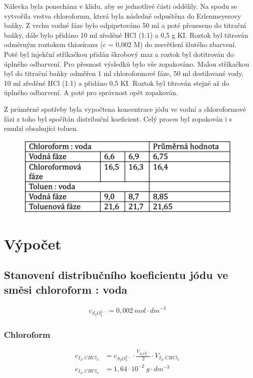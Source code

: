 \documentclass[13pt, a4paper, twoside]{article}
\begin{document}
Nálevka byla ponechána v klidu, aby se jednotlivé části oddělily. Na spodu se vytvořila vrstva chloroformu, která byla následně odpuštěna do Erlenmeyerovy baňky. Z vrchu vodné fáze bylo odpipetováno 50 ml a poté přeneseno do titrační baňky, dále bylo přidáno 10 ml zředěné HCl (1:1) a 0,5 g KI. Roztok byl titrován odměrným roztokem thiosíranu (c = 0,002 M) do zesvětlení žlutého zbarvení. Poté byl injekční stříkačkou přidán škrobový maz a roztok byl dotitrován do úplného odbarvení. Pro přesnost výsledků bylo vše zopakováno.
Malou stříkačkou byl do titrační baňky odměřen 1 ml chloroformové fáze, 50 ml destilované vody, 10 ml zředěné HCl (1:1) a přidáno 0,5 KI. Roztok byl titrován stejně až do úplného odbarvení. A poté pro správnost opět zopakován.

Z průměrné spotřeby byla vypočtena koncentrace jódu ve vodní a chloroformové fázi z toho byl spočítán distribuční koeficient.
Celý proces byl zopakován i s emulzí obsahující toluen.

\begin{figure}[H]
    \centering
    \includegraphics[width=13cm]{hh.png}
\end{figure}

\section*{Výpočet}
\subsection*{Stanovení distribučního koeficientu jódu ve směsi chloroform : voda}
\begin{align*}
    c_{S_2O_3^{2-}} = 0,002\: mol \cdot dm^{-3}
\end{align*}
\subsubsection*{Chloroform}
\begin{align*}
    c_{I_2, CHCl_3} &= c_{S_2O_3^{2-}} \cdot \frac{V_{S_2O_3^{2-}}}{2} \cdot V_{I_2, CHCl_3}\\
    c_{I_2, CHCl_3} &= 1,64 \cdot 10^{-2}\: g \cdot dm^{-3}
\end{align*}
\end{document}
